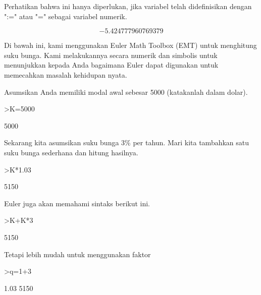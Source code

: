 \documentclass[a4paper,10pt]{article}
\begin{document}
\begin{eulernotebook}
\begin{eulercomment}
Perhatikan bahwa ini hanya diperlukan, jika variabel telah
didefinisikan dengan ":=" atau "=" sebagai variabel numerik.
\end{eulercomment}
\begin{eulerformula}
\[
-5.424777960769379
\]
\end{eulerformula}
\begin{eulercomment}
Di bawah ini, kami menggunakan Euler Math Toolbox (EMT) untuk
menghitung suku bunga. Kami melakukannya secara numerik dan simbolis
untuk menunjukkan kepada Anda bagaimana Euler dapat digunakan untuk
memecahkan masalah kehidupan nyata.

Asumsikan Anda memiliki modal awal sebesar 5000 (katakanlah dalam
dolar).
\end{eulercomment}
\begin{eulerprompt}
>K=5000
\end{eulerprompt}
\begin{euleroutput}
  5000
\end{euleroutput}
\begin{eulercomment}
Sekarang kita asumsikan suku bunga 3\% per tahun. Mari kita tambahkan
satu suku bunga sederhana dan hitung hasilnya.
\end{eulercomment}
\begin{eulerprompt}
>K*1.03
\end{eulerprompt}
\begin{euleroutput}
  5150
\end{euleroutput}
\begin{eulercomment}
Euler juga akan memahami sintaks berikut ini.
\end{eulercomment}
\begin{eulerprompt}
>K+K*3%
\end{eulerprompt}
\begin{euleroutput}
  5150
\end{euleroutput}
\begin{eulercomment}
Tetapi lebih mudah untuk menggunakan faktor
\end{eulercomment}
\begin{eulerprompt}
>q=1+3%
\end{eulerprompt}
\begin{euleroutput}
  1.03
  5150
\end{euleroutput}
\begin{eulercomment}

\end{eulercomment}
\end{eulernotebook}
\end{document}

